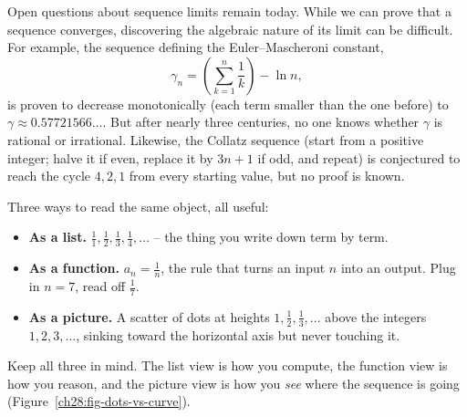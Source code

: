 \begin{historybox}
Open questions about sequence limits remain today. While we can prove that a sequence converges, discovering the algebraic nature of its limit can be difficult. For example, the sequence defining the Euler--Mascheroni constant,
\[
  \gamma_n = \left(\sum_{k=1}^n \frac{1}{k}\right) - \ln n,
\]
is proven to decrease monotonically (each term smaller than the one before) to $\gamma \approx 0.57721566\dots$. But after nearly three centuries, no one knows whether $\gamma$ is rational or irrational. Likewise, the Collatz sequence (start from a positive integer; halve it if even, replace it by $3n+1$ if odd, and repeat) is conjectured to reach the cycle $4, 2, 1$ from every starting value, but no proof is known.
\end{historybox}

\begin{intuitionbox}
Three ways to read the same object, all useful:
\begin{itemize}
  \item \textbf{As a list.} $\tfrac11, \tfrac12, \tfrac13, \tfrac14, \dots$ --
        the thing you write down term by term.
  \item \textbf{As a function.} $a_n = \tfrac1n$, the rule that turns an input
        $n$ into an output. Plug in $n=7$, read off $\tfrac17$.
  \item \textbf{As a picture.} A scatter of dots at heights
        $1, \tfrac12, \tfrac13, \dots$ above the integers $1, 2, 3, \dots$,
        sinking toward the horizontal axis but never touching it.
\end{itemize}
Keep all three in mind. The list view is how you compute, the function view is
how you reason, and the picture view is how you \emph{see} where the sequence is
going (Figure~\ref{ch28:fig-dots-vs-curve}).
\end{intuitionbox}

